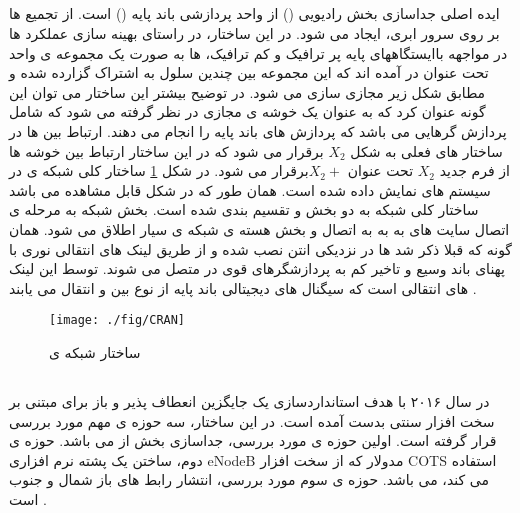 \subsection{} 
ایده اصلی  جداسازی بخش رادیویی () 
 از واحد پردازشی باند پایه ()
  است.
از تجمیع  ها بر روی سرور ابری،  ایجاد می شود.
در این ساختار، در راستای بهینه سازی عملکرد 
 ها در مواجهه باایستگاههای پایه پر ترافیک و کم ترافیک،
 ها به صورت یک مجموعه ی واحد تحت عنوان 
 در آمده اند که این مجموعه بین چندین سلول 
 به اشتراک گزارده شده و مطابق شکل زیر مجازی سازی
می شود. 
در توضیح بیشتر این ساختار می توان این گونه
عنوان کرد که  به عنوان یک خوشه ی مجازی
در نظر گرفته می شود که شامل پردازش گرهایی می باشد
که پردازش های باند پایه را انجام می دهند. ارتباط بین
  ها در ساختار های فعلی به شکل  $X_2$ برقرار می شود
که در این ساختار ارتباط بین خوشه ها از فرم جدید $X_2$
تحت عنوان  $X_2 +$برقرار می شود.
\newline
در شکل \ref{fig:C-RAN} ساختار کلی شبکه ی   در سیستم های
 نمایش داده شده است. همان طور که در شکل قابل
مشاهده می باشد ساختار کلی شبکه   به دو بخش
  و  تقسیم بندی شده است. بخش
 شبکه به مرحله ی اتصال سایت های به
 به  به اتصال  و بخش 
هسته ی شبکه ی سیار اطلاق می شود. همان گونه که قبلا
ذکر شد  ها در نزدیکی انتن نصب شده و از طریق
لینک های انتقالی نوری با پهنای باند وسیع و تاخیر کم به
پردازشگرهای قوی در  متصل می شوند. توسط این
لینک های انتقالی است که سیگنال های دیجیتالی باند
پایه از نوع  بین  و  انتقال می یابند \cite{checko2015cloud}.
\begin{figure}[H]
  \centering
    \texttt{[image: ./fig/CRAN]}
  \caption{ساختار شبکه ی  \cite{checko2015cloud}}
  \label{fig:C-RAN}
\end{figure}
\subsection{}
در سال ۲۰۱۶ با هدف استانداردسازی یک جایگزین انعطاف پذیر و باز برای 
مبتنی بر سخت افزار سنتی بدست آمده است.
 در این ساختار، سه حوزه ی مهم مورد بررسی قرار گرفته است.
اولین حوزه ی مورد بررسی، جداسازی بخش  از 
می باشد. حوزه ی دوم،
ساختن یک پشته نرم افزاری eNodeB مدولار که از سخت افزار COTS استفاده می کند، می باشد.
حوزه ی سوم مورد بررسی، انتشار رابط های باز شمال و جنوب است
\cite{xran}.
